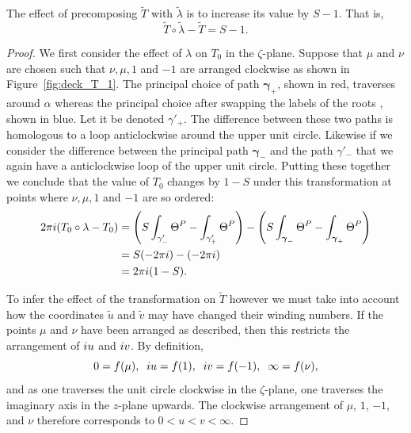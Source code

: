 \documentclass{article}
\begin{document}
\begin{lem}
\label{lem:T shift}
The effect of precomposing $\tilde{T}$ with $\tilde{\lambda}$ is to increase its value by $S-1$. That is,
\[
\tilde{T} \circ \tilde{\lambda} - \tilde{T}
= S-1.
\]
\begin{proof}
We first consider the effect of $\lambda$ on $T_0$ in the $\zeta$-plane. Suppose that $\mu$ and $\nu$ are chosen such that $\nu,\mu,1$ and $-1$ are arranged clockwise as shown in Figure~\ref{fig:deck_T_1}. The principal choice of path $\boldsymbol{\gamma}_+$, shown in red, traverses around $\alpha$ whereas the principal choice after swapping the labels of the roots , shown in blue. Let it be denoted $\gamma'_+$.
The difference between these two paths is homologous to a loop anticlockwise around the upper unit circle. 
Likewise if we consider the difference between the principal path $\boldsymbol{\gamma}_-$ and the path $\gamma'_- $ that  we again have a anticlockwise loop of the upper unit circle.
Putting these together we conclude that the value of $T_0$ changes by $1-S$ under this transformation at points where $\nu,\mu,1$ and $-1$ are so ordered:
\begin{align*}
2\pi i (T_0 \circ \lambda - T_0)
&= \left( S\int_{\gamma'_-} \Theta^P - \int_{\gamma'_+} \Theta^P \right) - \left( S\int_{\boldsymbol{\gamma}_-} \Theta^P - \int_{\boldsymbol{\gamma}_+} \Theta^P \right) \\
&= S(-2\pi i) - (-2\pi i) \\
&= 2\pi i (1-S).
\end{align*}

To infer the effect of the transformation on $\tilde{T}$ however we must take into account how the coordinates $\tilde{u}$ and $\tilde{v}$ may have changed their winding numbers. If the points $\mu$ and $\nu$ have been arranged as described, then this restricts the arrangement of $i u$ and $i v$. By definition,
\[
0 = f(\mu),\;\; i u = f(1),\;\; i v = f(-1),\;\; \infty = f(\nu),
\]
and as one traverses the unit circle clockwise in the $\zeta$-plane, one traverses the imaginary axis in the $z$-plane upwards. The clockwise arrangement of $\mu$, $1$, $-1$, and $\nu$ therefore corresponds to $0 < u < v < \infty$.


\end{proof}
\end{lem}
\end{document}
